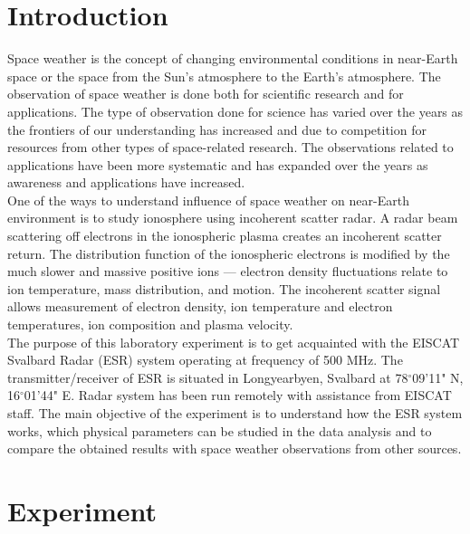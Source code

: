 \documentclass{article}
\begin{document}
\section{Introduction}
Space weather is the concept of changing environmental conditions in near-Earth space or the space from the Sun's atmosphere to the Earth's atmosphere. The observation of space weather is done both for scientific research and for applications. The type of observation done for science has varied over the years as the frontiers of our understanding has increased and due to competition for resources from other types of space-related research. The observations related to applications have been more systematic and has expanded over the years as awareness and applications have increased. \cite{Wiki:2012sw}\\
One of the ways to understand influence of space weather on near-Earth environment is to study ionosphere using incoherent scatter radar. A radar beam scattering off electrons in the ionospheric plasma creates an incoherent scatter return. The distribution function of the ionospheric electrons is modified by the much slower and massive positive ions — electron density fluctuations relate to ion temperature, mass distribution, and motion. The incoherent scatter signal allows measurement of electron density, ion temperature and electron temperatures, ion composition and plasma velocity. \cite{Wiki:2012is}
\\
The purpose of this laboratory experiment is to get acquainted with the EISCAT Svalbard Radar (ESR) system operating at frequency of 500 MHz. The transmitter/receiver of ESR is situated in Longyearbyen, Svalbard at 78$^{\circ}$09'11" N, 16$^{\circ}$01'44" E. Radar system has been run remotely with assistance from EISCAT staff. The main objective of the experiment is to understand how the ESR system works, which physical parameters can be studied in the data analysis and to compare the obtained results with space weather observations from other sources. \cite{Barabash:2011esr}


\section{Experiment}
\end{document}

